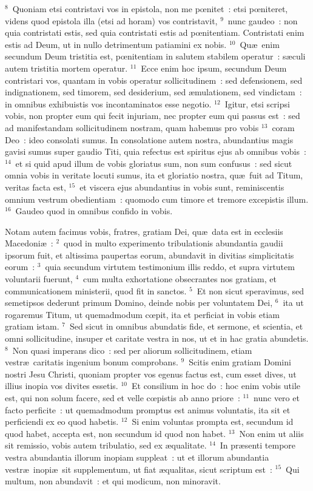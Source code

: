 ${}^{8}$~Quoniam etsi contristavi vos in epistola, non me pœnitet~: etsi pœniteret, videns quod epistola illa (etsi ad horam) vos contristavit,
${}^{9}$~nunc gaudeo~: non quia contristati estis, sed quia contristati estis ad pœnitentiam. Contristati enim estis ad Deum, ut in nullo detrimentum patiamini ex nobis.
${}^{10}$~Qu\ae\ enim secundum Deum tristitia est, pœnitentiam in salutem stabilem operatur~: s\ae culi autem tristitia mortem operatur.
${}^{11}$~Ecce enim hoc ipsum, secundum Deum contristari vos, quantam in vobis operatur sollicitudinem~: sed defensionem, sed indignationem, sed timorem, sed desiderium, sed \ae mulationem, sed vindictam~: in omnibus exhibuistis vos incontaminatos esse negotio.
${}^{12}$~Igitur, etsi scripsi vobis, non propter eum qui fecit injuriam, nec propter eum qui passus est~: sed ad manifestandam sollicitudinem nostram, quam habemus pro vobis
${}^{13}$~coram Deo~: ideo consolati sumus. In consolatione autem nostra, abundantius magis gavisi sumus super gaudio Titi, quia refectus est spiritus ejus ab omnibus vobis~:
${}^{14}$~et si quid apud illum de vobis gloriatus sum, non sum confusus~: sed sicut omnia vobis in veritate locuti sumus, ita et gloriatio nostra, qu\ae\ fuit ad Titum, veritas facta est,
${}^{15}$~et viscera ejus abundantius in vobis sunt, reminiscentis omnium vestrum obedientiam~: quomodo cum timore et tremore excepistis illum.
${}^{16}$~Gaudeo quod in omnibus confido in vobis.

\bchapter
\lettrine[lines=3,image=true,loversize=0.05,lraise=-0.03]{N}{}otam autem facimus vobis, fratres, gratiam Dei, qu\ae\ data est in ecclesiis Macedoni\ae~:
${}^{2}$~quod in multo experimento tribulationis abundantia gaudii ipsorum fuit, et altissima paupertas eorum, abundavit in divitias simplicitatis eorum~:
${}^{3}$~quia secundum virtutem testimonium illis reddo, et supra virtutem voluntarii fuerunt,
${}^{4}$~cum multa exhortatione obsecrantes nos gratiam, et communicationem ministerii, quod fit in sanctos.
${}^{5}$~Et non sicut speravimus, sed semetipsos dederunt primum Domino, deinde nobis per voluntatem Dei,
${}^{6}$~ita ut rogaremus Titum, ut quemadmodum cœpit, ita et perficiat in vobis etiam gratiam istam.
${}^{7}$~Sed sicut in omnibus abundatis fide, et sermone, et scientia, et omni sollicitudine, insuper et caritate vestra in nos, ut et in hac gratia abundetis.
${}^{8}$~Non quasi imperans dico~: sed per aliorum sollicitudinem, etiam vestr\ae\ caritatis ingenium bonum comprobans.
${}^{9}$~Scitis enim gratiam Domini nostri Jesu Christi, quoniam propter vos egenus factus est, cum esset dives, ut illius inopia vos divites essetis.
${}^{10}$~Et consilium in hoc do~: hoc enim vobis utile est, qui non solum facere, sed et velle cœpistis ab anno priore~:
${}^{11}$~nunc vero et facto perficite~: ut quemadmodum promptus est animus voluntatis, ita sit et perficiendi ex eo quod habetis.
${}^{12}$~Si enim voluntas prompta est, secundum id quod habet, accepta est, non secundum id quod non habet.
${}^{13}$~Non enim ut aliis sit remissio, vobis autem tribulatio, sed ex \ae qualitate.
${}^{14}$~In pr\ae senti tempore vestra abundantia illorum inopiam suppleat~: ut et illorum abundantia vestr\ae\ inopi\ae\ sit supplementum, ut fiat \ae qualitas, sicut scriptum est~:
${}^{15}$~Qui multum, non abundavit~: et qui modicum, non minoravit.


